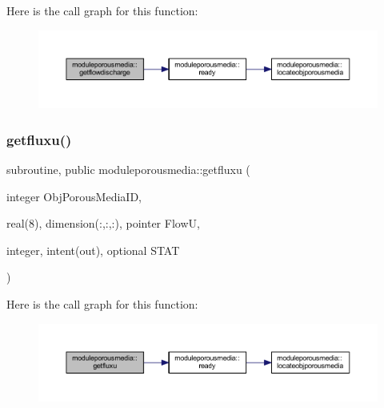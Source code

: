 Here is the call graph for this function\+:\nopagebreak
\begin{figure}[H]
\begin{center}
\leavevmode
\includegraphics[width=350pt]{namespacemoduleporousmedia_a26ca2f410bb96e145f78213b45a7a519_cgraph}
\end{center}
\end{figure}
\mbox{\label{namespacemoduleporousmedia_adf0daee2f37be73787378affc272dbc0}} 
\subsubsection{\texorpdfstring{getfluxu()}{getfluxu()}}
{\footnotesize\ttfamily subroutine, public moduleporousmedia\+::getfluxu (\begin{DoxyParamCaption}\item[{integer}]{Obj\+Porous\+Media\+ID,  }\item[{real(8), dimension(\+:,\+:,\+:), pointer}]{FlowU,  }\item[{integer, intent(out), optional}]{S\+T\+AT }\end{DoxyParamCaption})}

Here is the call graph for this function\+:\nopagebreak
\begin{figure}[H]
\begin{center}
\leavevmode
\includegraphics[width=350pt]{namespacemoduleporousmedia_adf0daee2f37be73787378affc272dbc0_cgraph}
\end{center}
\end{figure}
\mbox{\label{namespacemoduleporousmedia_a7232e9ac88cf3c92c636f7432acbec07}} 
